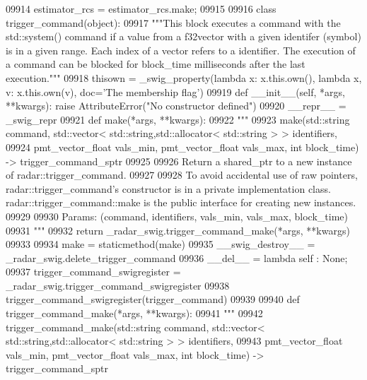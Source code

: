 \begin{DoxyCode}
{{{{{{{{{{{{{{{{{{{{{{{{{{{{{{{{09914 estimator\_rcs = estimator\_rcs.make;
09915 
09916 \textcolor{keyword}{class }trigger_command(object):
09917     \textcolor{stringliteral}{"""This block executes a command with the std::system() command if a value from a f32vector with a
       given identifer (symbol) is in a given range. Each index of a vector refers to a identifier. The execution of a
       command can be blocked for block\_time milliseconds after the last execution."""}
09918     thisown = _swig_property(\textcolor{keyword}{lambda} x: x.this.own(), \textcolor{keyword}{lambda} x, v: x.this.own(v), doc=\textcolor{stringliteral}{'The membership flag'})
09919     \textcolor{keyword}{def }__init__(self, *args, **kwargs): \textcolor{keywordflow}{raise} AttributeError(\textcolor{stringliteral}{"No constructor defined"})
09920     \_\_repr\_\_ = \_swig\_repr
09921     \textcolor{keyword}{def }make(*args, **kwargs):
09922         \textcolor{stringliteral}{"""}
09923 \textcolor{stringliteral}{        make(std::string command, std::vector< std::string,std::allocator< std::string > > identifiers, }
09924 \textcolor{stringliteral}{            pmt\_vector\_float vals\_min, pmt\_vector\_float vals\_max, int block\_time) -> trigger\_command\_sptr}
09925 \textcolor{stringliteral}{}
09926 \textcolor{stringliteral}{        Return a shared\_ptr to a new instance of radar::trigger\_command.}
09927 \textcolor{stringliteral}{}
09928 \textcolor{stringliteral}{        To avoid accidental use of raw pointers, radar::trigger\_command's constructor is in a private
       implementation class. radar::trigger\_command::make is the public interface for creating new instances.}
09929 \textcolor{stringliteral}{}
09930 \textcolor{stringliteral}{        Params: (command, identifiers, vals\_min, vals\_max, block\_time)}
09931 \textcolor{stringliteral}{        """}
09932         \textcolor{keywordflow}{return} \_radar\_swig.trigger\_command\_make(*args, **kwargs)
09933 
09934     make = staticmethod(make)
09935     \_\_swig\_destroy\_\_ = \_radar\_swig.delete\_trigger\_command
09936     \_\_del\_\_ = \textcolor{keyword}{lambda} self : \textcolor{keywordtype}{None};
09937 trigger\_command\_swigregister = \_radar\_swig.trigger\_command\_swigregister
09938 trigger_command_swigregister(trigger\_command)
09939 
09940 \textcolor{keyword}{def }trigger_command_make(*args, **kwargs):
09941   \textcolor{stringliteral}{"""}
09942 \textcolor{stringliteral}{    trigger\_command\_make(std::string command, std::vector< std::string,std::allocator< std::string > >
       identifiers, }
09943 \textcolor{stringliteral}{        pmt\_vector\_float vals\_min, pmt\_vector\_float vals\_max, int block\_time) -> trigger\_command\_sptr}
}}}}}}}}}}}}}}}}}}}}}}}}}}}}}}}}
\end{DoxyCode}
